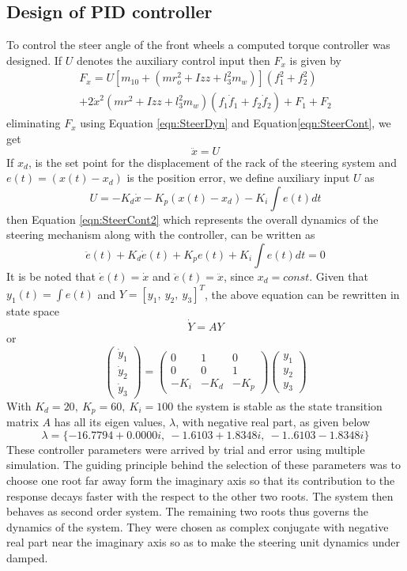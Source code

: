 {\subsection{Design of PID controller}
To control the steer angle of the front wheels a computed torque controller \cite{craig2005introduction} was designed. If $U$ denotes the auxiliary control input then $F_x$ is given by
\begin{multline}
\label{eqn:SteerCont}
F_x=U\left[ m_{10}+\left(mr_o^2+I{zz}+l^2_3m_w \right) \right] \left( f_1^2+f_2^2 \right)\\
+2\dot x^2 \left(mr^2+I{zz}+l_3^2 m_w \right) \left( f_1 \dot f_1 +f_2 \dot f_2\right) 
+F_1+F_2
\end{multline}
eliminating  $F_x$ using Equation \ref{eqn:SteerDyn} and Equation\ref{eqn:SteerCont}, we get
\begin{equation}
\label{eqn:SteerCont2}
\ddot x =U
\end{equation}
If $x_d$, is the set point for the displacement of the rack of the steering system and $e(t)=(x(t)-x_d)$ is the position error, we define auxiliary input $U$ as  
\begin{equation}
\label{eqn:SteerCont3}
 U=-K_d \dot x -K_p \left(x(t)-x_d \right) -K_i\int e(t)dt \end{equation}
then Equation \ref{eqn:SteerCont2} which represents the overall dynamics of the steering mechanism along with the controller, can  be written as 
\[\ddot e(t) +K_d \dot{e}(t) +K_p e(t)+ K_i\int e(t)dt=0 \]
It is be noted that $\dot e(t)=\dot x$ and $\ddot e(t)=\ddot x$, since $x_d=const$. Given that  $y_1(t)= \int e(t)$ and $Y=[y_1,~y_2,~y_3]^T$, the above equation can be rewritten in state space \[\dot{Y}=AY\] or
\begin{equation}
\begin{pmatrix}
\dot y_1 \\ \dot y_2 \\\dot y_3
\end{pmatrix}
=
\begin{pmatrix}
0 & 1 & 0\\ 0 & 0 & 1\\ -K_i & -K_d & -K_p
\end{pmatrix}
\begin{pmatrix}
 y_1 \\ y_2 \\ y_3
\end{pmatrix}
\end{equation}
With $K_d=20,~K_p=60,~K_i=100 $ the system is stable as  the state transition matrix $A$ has all its eigen values, $\lambda$, with negative real part, as given below 
\[ \lambda= \{-16.7794 + 0.0000i, ~ -1.6103 + 1.8348i, ~ -1..6103 - 1.8348i\}\]
 These controller parameters were arrived by trial and error using multiple simulation. The guiding principle behind the selection of these parameters was to choose one root far away form the imaginary axis so that its contribution to the response decays faster with the respect to  the other two roots.  The system then behaves as second order system. The remaining two roots thus governs the dynamics of the system.  They were chosen as complex conjugate with negative real part near the imaginary axis so as to make the steering unit dynamics  under damped.

}
